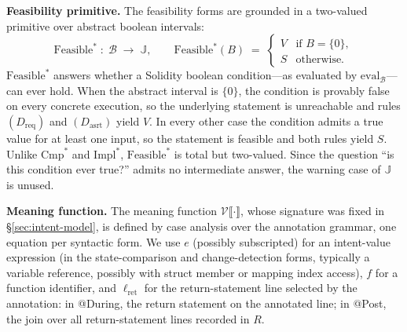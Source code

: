 \documentclass[pdflatex,sn-basic]{sn-jnl}%
\theoremstyle{thmstyleone}%
\theoremstyle{thmstyletwo}%
\theoremstyle{thmstylethree}%
\begin{document}
\smallskip
\noindent\textbf{Feasibility primitive.}
The feasibility forms are grounded in a two-valued primitive over abstract boolean intervals:
\[
\text{Feasible}^* \;:\; \mathcal{B} \;\to\; \mathbb{J}, \qquad
\text{Feasible}^*(B) \;=\;
\begin{cases}
V & \text{if } B = \{0\}, \\
S & \text{otherwise.}
\end{cases}
\]
$\text{Feasible}^*$ answers whether a Solidity boolean condition---as evaluated by $\text{eval}_{\mathcal{B}}$---can ever hold.
When the abstract interval is $\{0\}$, the condition is provably false on every concrete execution, so the underlying statement is unreachable and rules $(D_{\text{req}})$ and $(D_{\text{asrt}})$ yield $V$.
In every other case the condition admits a true value for at least one input, so the statement is feasible and both rules yield $S$.
Unlike $\text{Cmp}^*$ and $\text{Impl}^*$, $\text{Feasible}^*$ is total but two-valued.
Since the question ``is this condition ever true?'' admits no intermediate answer, the warning case of $\mathbb{J}$ is unused.

\smallskip
\noindent\textbf{Meaning function.}
The meaning function $\mathcal{V}\llbracket \cdot \rrbracket$, whose signature was fixed in §\ref{sec:intent-model}, is defined by case analysis over the annotation grammar, one equation per syntactic form.
We use $e$ (possibly subscripted) for an intent-value expression (in the state-comparison and change-detection forms, typically a variable reference, possibly with struct member or mapping index access), $f$ for a function identifier, and $\ell_{\text{ret}}$ for the return-statement line selected by the annotation: in @During, the return statement on the annotated line; in @Post, the join over all return-statement lines recorded in $R$.
\end{document}
